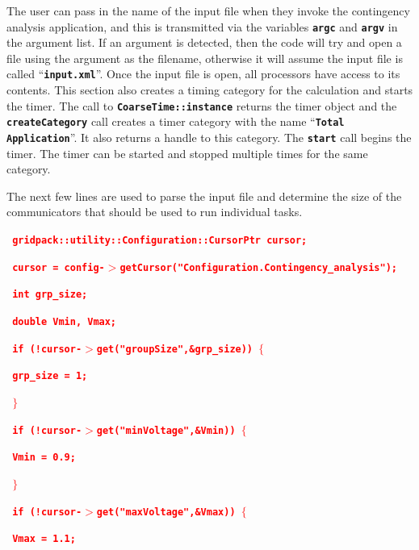 \documentclass[12pt]{report} %
\begin{document}
The user can pass in the name of the input file when they invoke the contingency analysis application, and this is transmitted via the variables \texttt{\textbf{argc}} and \texttt{\textbf{argv}} in the argument list. If an argument is detected, then the code will try and open a file using the argument as the filename, otherwise it will assume the input file is called ``\texttt{\textbf{input.xml}}''. Once the input file is open, all processors have access to its contents. This section also creates a timing category for the calculation and starts the timer. The call to \texttt{\textbf{CoarseTime::instance}} returns the timer object and the \texttt{\textbf{createCategory}} call creates a timer category with the name ``\texttt{\textbf{Total Application}}''. It also returns a handle to this category. The \texttt{\textbf{start}} call begins the timer. The timer can be started and stopped multiple times for the same category.

The next few lines are used to parse the input file and determine the size of the communicators that should be used to run individual tasks.

\textcolor{red}{\texttt{\textbf{  gridpack::utility::Configuration::CursorPtr cursor;}}}

\textcolor{red}{\texttt{\textbf{  cursor = config-$\boldsymbol{\mathrm{>}}$getCursor("Configuration.Contingency\_analysis");}}}

\textcolor{red}{\texttt{\textbf{  int grp\_size;}}}

\textcolor{red}{\texttt{\textbf{  double Vmin, Vmax;}}}

\textcolor{red}{\texttt{\textbf{  if (!cursor-$\boldsymbol{\mathrm{>}}$get("groupSize",\&grp\_size)) $\boldsymbol{\mathrm{\{}}$}}}

\textcolor{red}{\texttt{\textbf{    grp\_size = 1;}}}

\textcolor{red}{\texttt{\textbf{  $\boldsymbol{\mathrm{\}}}$}}}

\textcolor{red}{\texttt{\textbf{  if (!cursor-$\boldsymbol{\mathrm{>}}$get("minVoltage",\&Vmin)) $\boldsymbol{\mathrm{\{}}$}}}

\textcolor{red}{\texttt{\textbf{    Vmin = 0.9;}}}

\textcolor{red}{\texttt{\textbf{  $\boldsymbol{\mathrm{\}}}$}}}

\textcolor{red}{\texttt{\textbf{  if (!cursor-$\boldsymbol{\mathrm{>}}$get("maxVoltage",\&Vmax)) $\boldsymbol{\mathrm{\{}}$}}}

\textcolor{red}{\texttt{\textbf{    Vmax = 1.1;}}}
\end{document}
